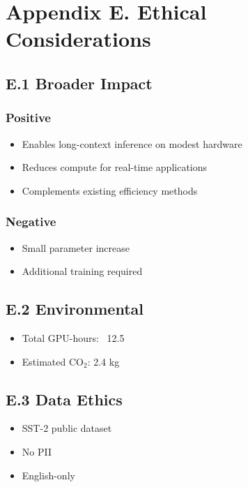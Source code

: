 \section{Appendix E. Ethical Considerations}

\subsection{E.1 Broader Impact}

\subsubsection{Positive}
\begin{itemize}
\item Enables long-context inference on modest hardware
\item Reduces compute for real-time applications
\item Complements existing efficiency methods

\end{itemize}
\subsubsection{Negative}
\begin{itemize}
\item Small parameter increase
\item Additional training required

\end{itemize}
\subsection{E.2 Environmental}

\begin{itemize}
\item Total GPU-hours: ~12.5
\item Estimated CO$_2$: 2.4 kg

\end{itemize}
\subsection{E.3 Data Ethics}

\begin{itemize}
\item SST-2 public dataset
\item No PII
\item English-only

\end{itemize}
